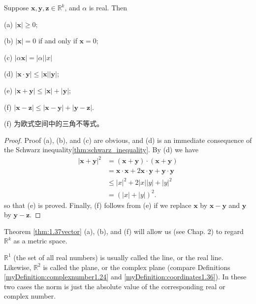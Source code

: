 \begin{thm}\label{thm:1.37vector}
    Suppose $\mathbf{x}, \mathbf{y}, \mathbf{z}\in\mathbb{R}^k$, and $\alpha$ is real. Then

(a) $| \mathbf{x}| \geq 0$;

(b) $| \mathbf{x}| = 0$ if and only if $\mathbf{x} =0$;

(c) $| \alpha \mathbf{x}| = | \alpha||x|$

(d) $|\mathbf{x}\cdot\mathbf{y}| \leq  |\mathbf{x}| | \mathbf{y}|$;

(e) $|\mathbf{x}+\mathbf{y}| \leq | \mathbf{x} | + | \mathbf{y}|$;

(f) $|\mathbf{x}-\mathbf{z}| \leq |\mathbf{x}-\mathbf{y}| + |\mathbf{y}-\mathbf{z}|$.
\end{thm}

(f) 为欧式空间中的三角不等式。

\begin{proof}
    Proof (a), (b), and (c) are obvious, and (d) is an immediate consequence of the Schwarz inequality\ref{thm:schwarz_inequality}. By (d) we have 
    \begin{align*}
        |\mathbf{x} + \mathbf{y}|^2
        &= (\mathbf{x} + \mathbf{y}) \cdot (\mathbf{x} + \mathbf{y})\\
        &= \mathbf{x} \cdot \mathbf{x} + 2\mathbf{x} \cdot \mathbf{y} + \mathbf{y} \cdot \mathbf{y}\\
        &\leq |x|^2 + 2|x||y| + |y|^2\\
        &= \left(|x| + |y|\right)^2.
    \end{align*}
    so that (e) is proved. Finally, (f) follows from (e) if we replace $\mathbf{x}$ by $\mathbf{x}-\mathbf{y}$ and $\mathbf{y}$ by $\mathbf{y}-\mathbf{z}$.
\end{proof}

\begin{myRemark}\label{myRemark:1.38}
    Theorem \ref{thm:1.37vector} (a), (b), and (f) will allow us (see Chap. 2) to
    regard $\mathbb{R}^k$ as a metric space.
    
    $\mathbb{R}^1$ (the set of all real numbers) is usually called the line, or the real line. Likewise, $\mathbb{R}^2$ is called the plane, or the complex plane (compare Definitions \ref{myDefinition:complexnumber1.24} and \ref{myDefinition:coordinates1.36}). In these two cases the norm is just the absolute value of the corresponding real or complex number. 
\end{myRemark}
